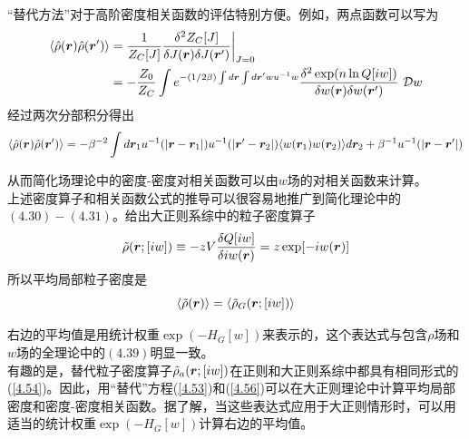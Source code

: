 “替代方法”对于高阶密度相关函数的评估特别方便。例如，两点函数可以写为\\
\begin{equation}
\begin{aligned}
\langle  \hat{ \rho } (\bm{r}) \hat{ \rho } (\bm{r}') \rangle &= \frac{1}{Z_{C}[J]} \frac{\delta ^{2}Z_{C}[J]}{\delta J(\bm{r}) \delta J(\bm{r}')} \bigg|_{J=0} \\&= -\frac{Z_0}{Z_{C}} \int  e^{-(1/2 \beta ) \int d\bm{r} \int d\bm{r}' w u^{-1} w } \frac{ \delta ^{2} \exp (n \ln Q[i w ])}{\delta w (\bm{r}) \delta w (\bm{r}')} ~\mathcal{D} w
\end{aligned}
\label{4.55}
\end{equation}
经过两次分部积分得出\\
\begin{equation}
\langle  \hat{ \rho } (\bm{r}) \hat{ \rho } (\bm{r}') \rangle = - \beta ^{-2} \int d\bm{r}_{1}  u^{-1}(|\bm{r}-\bm{r}_{1}|) u^{-1}(|\bm{r}'-\bm{r}_{2}|) \langle w(\bm{r}_1) w(\bm{r}_2)\rangle d\bm{r}_{2} + \beta ^{-1} u^{-1} (|\bm{r}-\bm{r}'|)
\label{4.56}
\end{equation}

从而简化场理论中的密度-密度对相关函数可以由$w$场的对相关函数来计算。\\

上述密度算子和相关函数公式的推导可以很容易地推广到简化理论中的$(4.30)-(4.31)$。给出大正则系综中的粒子密度算子\\
\begin{equation}
\tilde{ \rho }(\bm{r};[i w ]) \equiv -z V \frac{ \delta Q[i w]}{\delta i w (\bm{r})} = z \exp [-i w (\bm{r})]
\end{equation}
所以平均局部粒子密度是\\
\begin{equation}
\langle \tilde{ \rho } (\bm{r}) \rangle = \langle \tilde{ \rho }_{G}(\bm{r};[i w ]) \rangle
\end{equation}

右边的平均值是用统计权重$\exp ( -H_{G}[ w])$来表示的，这个表达式与包含$ \rho $场和$ w $场的全理论中的$(4.39)$明显一致。\\

有趣的是，替代粒子密度算子$ \tilde{ \rho }_{a}(\bm{r};[i w])$在正则和大正则系综中都具有相同形式的(\ref{4.54})。因此，用“替代”方程(\ref{4.53})和(\ref{4.56})可以在大正则理论中计算平均局部密度和密度-密度相关函数。据了解，当这些表达式应用于大正则情形时，可以用适当的统计权重$\exp (-H_{G}[ w ])$计算右边的平均值。\\

